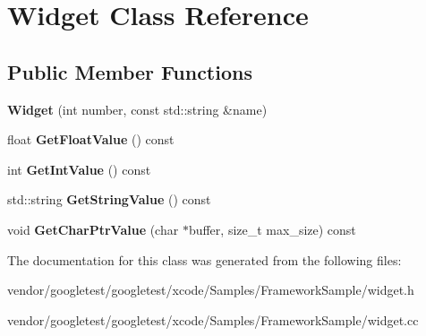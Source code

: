 \hypertarget{class_widget}{}\section{Widget Class Reference}
\label{class_widget}
\subsection*{Public Member Functions}
\begin{DoxyCompactItemize}
\item 
\mbox{\label{class_widget_ab573b75a8a69d29c298af2485fb9cda9}} 
{\bfseries Widget} (int number, const std\+::string \&name)
\item 
\mbox{\label{class_widget_abf639d975e02cabda8132873aca1a333}} 
float {\bfseries Get\+Float\+Value} () const
\item 
\mbox{\label{class_widget_a15e7d0423020a7a98063a749fb97bdd3}} 
int {\bfseries Get\+Int\+Value} () const
\item 
\mbox{\label{class_widget_a7a6e3a7fca3a9373f631c94dc1494d22}} 
std\+::string {\bfseries Get\+String\+Value} () const
\item 
\mbox{\label{class_widget_a50791a556979f22f5593383143c7f815}} 
void {\bfseries Get\+Char\+Ptr\+Value} (char $\ast$buffer, size\+\_\+t max\+\_\+size) const
\end{DoxyCompactItemize}


The documentation for this class was generated from the following files\+:\begin{DoxyCompactItemize}
\item 
vendor/googletest/googletest/xcode/\+Samples/\+Framework\+Sample/widget.\+h\item 
vendor/googletest/googletest/xcode/\+Samples/\+Framework\+Sample/widget.\+cc\end{DoxyCompactItemize}
